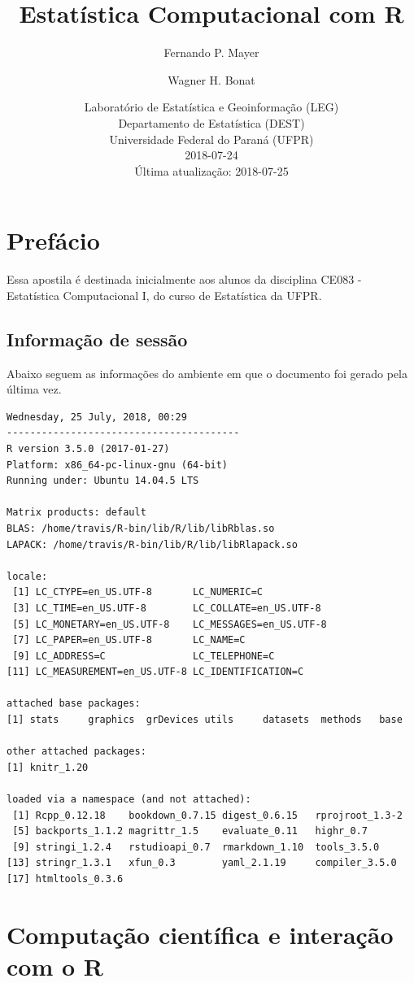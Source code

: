 \documentclass[10pt,a4paper]{book}
\title{Estatística Computacional com R}
\author{Fernando P. Mayer \and Wagner H. Bonat}
\date{Laboratório de Estatística e Geoinformação (LEG)\\
Departamento de Estatística (DEST)\\
Universidade Federal do Paraná (UFPR)\\[2\baselineskip]2018-07-24\\
Última atualização: 2018-07-25}
\begin{document}
\maketitle

{
\hypersetup{linkcolor=black}
\setcounter{tocdepth}{2}
\tableofcontents
}
\chapter*{Prefácio}\label{prefacio}


Essa apostila é destinada inicialmente aos alunos da disciplina CE083 -
Estatística Computacional I, do curso de Estatística da UFPR.

\section*{Informação de sessão}\label{informacao-de-sessao}


Abaixo seguem as informações do ambiente em que o documento foi gerado
pela última vez.

\begin{verbatim}
Wednesday, 25 July, 2018, 00:29
----------------------------------------
R version 3.5.0 (2017-01-27)
Platform: x86_64-pc-linux-gnu (64-bit)
Running under: Ubuntu 14.04.5 LTS

Matrix products: default
BLAS: /home/travis/R-bin/lib/R/lib/libRblas.so
LAPACK: /home/travis/R-bin/lib/R/lib/libRlapack.so

locale:
 [1] LC_CTYPE=en_US.UTF-8       LC_NUMERIC=C              
 [3] LC_TIME=en_US.UTF-8        LC_COLLATE=en_US.UTF-8    
 [5] LC_MONETARY=en_US.UTF-8    LC_MESSAGES=en_US.UTF-8   
 [7] LC_PAPER=en_US.UTF-8       LC_NAME=C                 
 [9] LC_ADDRESS=C               LC_TELEPHONE=C            
[11] LC_MEASUREMENT=en_US.UTF-8 LC_IDENTIFICATION=C       

attached base packages:
[1] stats     graphics  grDevices utils     datasets  methods   base     

other attached packages:
[1] knitr_1.20

loaded via a namespace (and not attached):
 [1] Rcpp_0.12.18    bookdown_0.7.15 digest_0.6.15   rprojroot_1.3-2
 [5] backports_1.1.2 magrittr_1.5    evaluate_0.11   highr_0.7      
 [9] stringi_1.2.4   rstudioapi_0.7  rmarkdown_1.10  tools_3.5.0    
[13] stringr_1.3.1   xfun_0.3        yaml_2.1.19     compiler_3.5.0 
[17] htmltools_0.3.6
\end{verbatim}

\chapter{Computação científica e interação com o
R}\label{computacao-cientifica-e-interacao-com-o-r}
\end{document}

